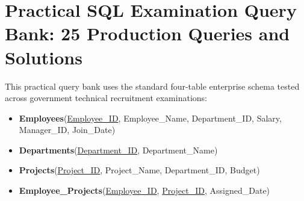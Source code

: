 \section{Practical SQL Examination Query Bank: 25 Production Queries and Solutions}
\label{sec:dbms_practical_sql_25}

This practical query bank uses the standard four-table enterprise schema tested across government technical recruitment examinations:
\begin{itemize}
    \item \textbf{Employees}(\underline{Employee\_ID}, Employee\_Name, Department\_ID, Salary, Manager\_ID, Join\_Date)
    \item \textbf{Departments}(\underline{Department\_ID}, Department\_Name)
    \item \textbf{Projects}(\underline{Project\_ID}, Project\_Name, Department\_ID, Budget)
    \item \textbf{Employee\_Projects}(\underline{Employee\_ID}, \underline{Project\_ID}, Assigned\_Date)
\end{itemize}

